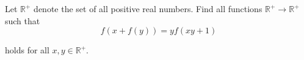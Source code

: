 Let $ \mathbb{R} ^{+} $ denote the set of all positive real numbers. Find all functions  $ \mathbb{R} ^{+} \to \mathbb{R} ^{+} $ such that\[ f(x+f(y)) = yf(xy+1)\]

holds for all $ x, y \in \mathbb{R} ^{+} $.